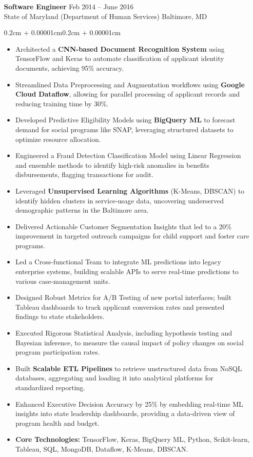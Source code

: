 \documentclass{article}
\newenvironment{highlights}{
    \begin{itemize}[
        topsep=0.10cm, 
        parsep=0.08cm, 
        partopsep=0pt, 
        itemsep=0.08cm, 
        leftmargin=0.4cm + 10pt
    ]
}{
    \end{itemize}
}
\newenvironment{onecolentry}{
    \begin{adjustwidth}{0.2cm + 0.00001cm}{0.2cm + 0.00001cm}
}{
    \end{adjustwidth}
}
\begin{document}
\textbf{Software Engineer} \hfill Feb 2014 -- June 2016 \\
State of Maryland (Department of Human Services) \hfill Baltimore, MD
\begin{onecolentry}
    \begin{highlights}
        \item Architected a \textbf{CNN-based Document Recognition System} using TensorFlow and Keras to automate classification of applicant identity documents, achieving 95\% accuracy.
        \item Streamlined Data Preprocessing and Augmentation workflows using \textbf{Google Cloud Dataflow}, allowing for parallel processing of applicant records and reducing training time by 30\%.
        \item Developed Predictive Eligibility Models using \textbf{BigQuery ML} to forecast demand for social programs like SNAP, leveraging structured datasets to optimize resource allocation.
        \item Engineered a Fraud Detection Classification Model using Linear Regression and ensemble methods to identify high-risk anomalies in benefits disbursements, flagging transactions for audit.
        \item Leveraged \textbf{Unsupervised Learning Algorithms} (K-Means, DBSCAN) to identify hidden clusters in service-usage data, uncovering underserved demographic patterns in the Baltimore area.
        \item Delivered Actionable Customer Segmentation Insights that led to a 20\% improvement in targeted outreach campaigns for child support and foster care programs.
        \item Led a Cross-functional Team to integrate ML predictions into legacy enterprise systems, building scalable APIs to serve real-time predictions to various case-management units.
        \item Designed Robust Metrics for A/B Testing of new portal interfaces; built Tableau dashboards to track applicant conversion rates and presented findings to state stakeholders.
        \item Executed Rigorous Statistical Analysis, including hypothesis testing and Bayesian inference, to measure the causal impact of policy changes on social program participation rates.
        \item Built \textbf{Scalable ETL Pipelines} to retrieve unstructured data from NoSQL databases, aggregating and loading it into analytical platforms for standardized reporting.
        \item Enhanced Executive Decision Accuracy by 25\% by embedding real-time ML insights into state leadership dashboards, providing a data-driven view of program health and budget.
        \item \textbf{Core Technologies:} TensorFlow, Keras, BigQuery ML, Python, Scikit-learn, Tableau, SQL, MongoDB, Dataflow, K-Means, DBSCAN.
    \end{highlights}
\end{onecolentry}
\end{document}

